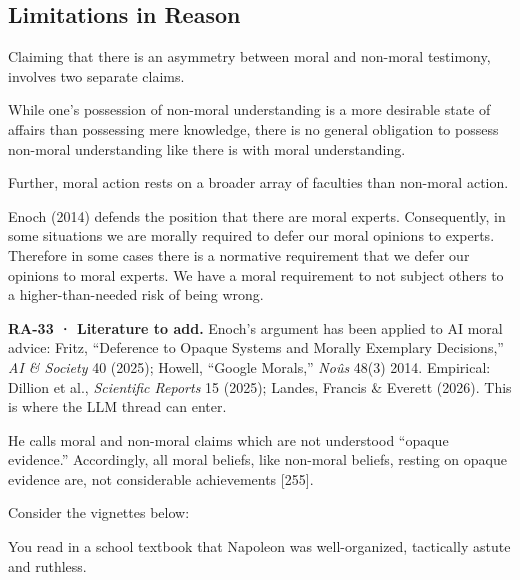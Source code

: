 \documentclass[
  letterpaper,
  DIV=11,
  numbers=noendperiod]{scrartcl}
\theoremstyle{remark}
\begin{document}
\subsection{Limitations in Reason}\label{limitations-in-reason}

Claiming that there is an asymmetry between moral and non-moral
testimony, involves two separate claims.

While one's possession of non-moral understanding is a more desirable
state of affairs than possessing mere knowledge, there is no general
obligation to possess non-moral understanding like there is with moral
understanding.

Further, moral action rests on a broader array of faculties than
non-moral action.

Enoch (2014) defends the position that there are moral experts.
Consequently, in some situations we are morally required to defer our
moral opinions to experts. Therefore in some cases there is a normative
requirement that we defer our opinions to moral experts. We have a moral
requirement to not subject others to a higher-than-needed risk of being
wrong.

\begin{tcolorbox}[enhanced jigsaw, arc=.35mm, bottomrule=.15mm, bottomtitle=1mm, breakable, colback=white, colbacktitle=quarto-callout-tip-color!10!white, colframe=quarto-callout-tip-color-frame, coltitle=black, left=2mm, leftrule=.75mm, opacityback=0, opacitybacktitle=0.6, rightrule=.15mm, title=\textcolor{quarto-callout-tip-color}{\faLightbulb}\hspace{0.5em}{Tip}, titlerule=0mm, toprule=.15mm, toptitle=1mm]

\textbf{RA-33 · Literature to add.} Enoch's argument has been applied to
AI moral advice: Fritz, ``Deference to Opaque Systems and Morally
Exemplary Decisions,'' \emph{AI \& Society} 40 (2025); Howell, ``Google
Morals,'' \emph{Noûs} 48(3) 2014. Empirical: Dillion et al.,
\emph{Scientific Reports} 15 (2025); Landes, Francis \& Everett (2026).
This is where the LLM thread can enter.

\end{tcolorbox}

He calls moral and non-moral claims which are not understood ``opaque
evidence.'' Accordingly, all moral beliefs, like non-moral beliefs,
resting on opaque evidence are, not considerable achievements {[}255{]}.

Consider the vignettes below:

You read in a school textbook that Napoleon was well-organized,
tactically astute and ruthless.
\end{document}
